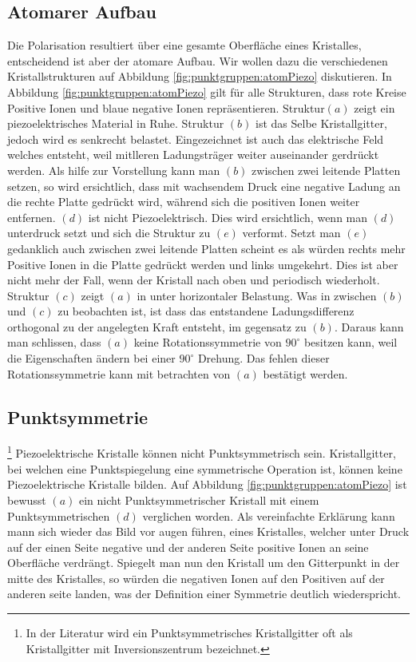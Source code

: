 \subsection{Atomarer Aufbau}
Die Polarisation resultiert über eine gesamte Oberfläche eines Kristalles, entscheidend ist aber der atomare Aufbau.
Wir wollen dazu die verschiedenen Kristallstrukturen auf Abbildung \ref{fig:punktgruppen:atomPiezo} diskutieren.
In Abbildung \ref{fig:punktgruppen:atomPiezo} gilt für alle Strukturen, dass rote Kreise Positive Ionen und blaue negative Ionen repräsentieren. 
Struktur$(a)$ zeigt ein piezoelektrisches Material in Ruhe. Struktur $(b)$ ist das Selbe Kristallgitter, jedoch wird es senkrecht belastet. 
Eingezeichnet ist auch das elektrische Feld welches entsteht, weil mitlleren Ladungsträger weiter auseinander gerdrückt werden.
Als hilfe zur Vorstellung kann man $(b)$ zwischen zwei leitende Platten setzen, 
so wird ersichtlich, dass mit wachsendem Druck eine negative Ladung an die rechte Platte gedrückt wird,
während sich die positiven Ionen weiter entfernen. 
$(d)$ ist nicht Piezoelektrisch.
Dies wird ersichtlich, wenn man $(d)$ unterdruck setzt und sich die Struktur zu $(e)$ verformt.
Setzt man  $(e)$ gedanklich auch zwischen zwei leitende Platten scheint es als würden rechts mehr Positive Ionen in die Platte gedrückt werden 
und links umgekehrt.
Dies ist aber nicht mehr der Fall, wenn der Kristall nach oben und periodisch wiederholt.
Struktur $(c)$ zeigt $(a)$ in unter horizontaler Belastung. 
Was in zwischen $(b)$ und $(c)$ zu beobachten ist, ist dass das entstandene Ladungsdifferenz orthogonal zu der angelegten Kraft entsteht,
im gegensatz zu $(b)$.
Daraus kann man schlissen, dass $(a)$ keine Rotationssymmetrie von $90^\circ$ besitzen kann, weil die Eigenschaften ändern bei einer $90^\circ$ Drehung. 
Das fehlen dieser Rotationssymmetrie kann mit betrachten von $(a)$ bestätigt werden. 

\subsection{Punktsymmetrie}\footnote{In der Literatur wird ein Punktsymmetrisches Kristallgitter oft als Kristallgitter mit Inversionszentrum bezeichnet.}
Piezoelektrische Kristalle können nicht Punktsymmetrisch sein.
Kristallgitter, bei welchen eine Punktspiegelung eine symmetrische Operation ist, können keine Piezoelektrische Kristalle bilden.
Auf Abbildung \ref{fig:punktgruppen:atomPiezo} ist bewusst $(a)$ ein nicht Punktsymmetrischer Kristall mit einem Punktsymmetrischen $(d)$ verglichen worden.
Als vereinfachte Erklärung kann mann sich wieder das Bild vor augen führen, eines Kristalles, 
welcher unter Druck auf der einen Seite negative und der anderen Seite positive Ionen an seine Oberfläche verdrängt.
Spiegelt man nun den Kristall um den Gitterpunkt in der mitte des Kristalles, so würden die negativen Ionen auf den Positiven auf der anderen seite landen,
was der Definition einer Symmetrie deutlich wiederspricht.

